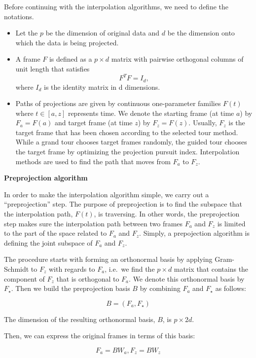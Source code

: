 Before continuing with the interpolation algorithms, we need to define
the notations.

\begin{itemize}
\item
  Let the \(p\) be the dimension of original data and \(d\) be the
  dimension onto which the data is being projected.
\item
  A frame \(F\) is defined as a \(p\times d\) matrix with pairwise
  orthogonal columns of unit length that satisfies \[F^TF = I_d,\] where
  \(I_d\) is the identity matrix in d dimensions.
\item
  Paths of projections are given by continuous one-parameter families
  \(F(t)\) where \(t\in [a, z]\) represents time. We denote the starting
  frame (at time \(a\)) by \(F_a = F(a)\) and target frame (at time
  \(z\)) by \(F_z = F(z)\). Usually, \(F_z\) is the target frame that
  has been chosen according to the selected tour method. While a grand
  tour chooses target frames randomly, the guided tour chooses the
  target frame by optimizing the projection pursuit index. Interpolation
  methods are used to find the path that moves from \(F_a\) to \(F_z\).
\end{itemize}

\textbf{Preprojection algorithm}

In order to make the interpolation algorithm simple, we carry out a
``preprojection'' step. The purpose of preprojection is to find the
subspace that the interpolation path, \(F(t)\), is traversing. In other
words, the preprojection step makes sure the interpolation path between
two frames \(F_a\) and \(F_z\) is limited to the part of the space
related to \(F_a\) and \(F_z\). Simply, a prepojection algorithm is
defining the joint subspace of \(F_a\) and \(F_z\).

The procedure starts with forming an orthonormal basis by applying
Gram-Schmidt to \(F_z\) with regards to \(F_a\), i.e.~we find the
\(p\times d\) matrix that contains the component of \(F_z\) that is
orthogonal to \(F_a\). We denote this orthonormal basis by \(F_\star\).
Then we build the preprojection basis \(B\) by combining \(F_a\) and
\(F_\star\) as follows:

\[B = (F_a, F_{\star})\]

The dimension of the resulting orthonormal basis, \(B\), is
\(p\times 2d\).

Then, we can express the original frames in terms of this basis:

\[F_a = B W_a, F_z = B W_z\]


